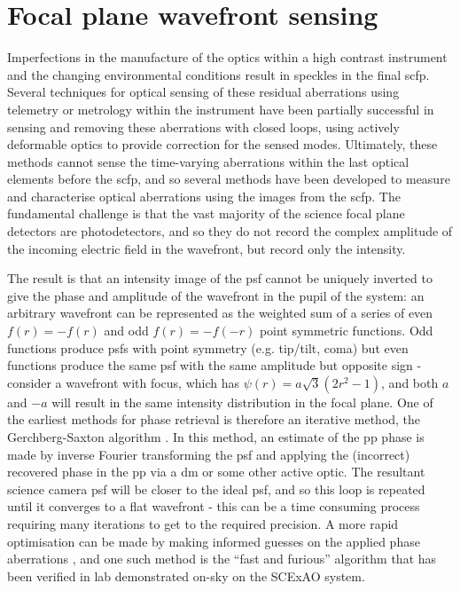 \documentclass[letterpaper]{ar-1col}
\begin{document}
\section{Focal plane wavefront sensing}

Imperfections in the manufacture of the optics within a high contrast instrument and the changing environmental conditions result in speckles in the final \ac{scfp}.
%
Several techniques for optical sensing of these residual aberrations using telemetry or metrology within the instrument have been partially successful in sensing and removing these aberrations with closed loops, using actively deformable optics to provide correction for the sensed modes.
%
Ultimately, these methods cannot sense the time-varying aberrations within the last optical elements before the \ac{scfp}, and so several methods have been developed to measure and characterise optical aberrations using the images from the \ac{scfp}.
%
The fundamental challenge is that the vast majority of the science focal plane detectors are photodetectors, and so they do not record the complex amplitude of the incoming electric field in the wavefront, but record only the intensity.

The result is that an intensity image of the \ac{psf} cannot be uniquely inverted to give the phase and amplitude of the wavefront in the pupil of the system: an arbitrary wavefront can be represented as the weighted sum of a series of even $f(r)=-f(r)$ and odd $f(r)=-f(-r)$ point symmetric functions.
%
Odd functions produce \acp{psf} with point symmetry (e.g. tip/tilt, coma) but even functions produce the same \ac{psf} with the same amplitude but opposite sign - consider a wavefront with focus, which has $\psi(r) = a\sqrt{3}(2r^2-1)$, and both $a$ and $-a$ will result in the same intensity distribution in the focal plane.
%
One of the earliest methods for phase retrieval is therefore an iterative method, the Gerchberg-Saxton algorithm \citep{Gerchberg72}.
%
In this method, an estimate of the \ac{pp} phase is made by inverse Fourier transforming the \ac{psf} and applying the (incorrect) recovered phase in the \ac{pp} via a \ac{dm} or some other active optic.
%
The resultant science camera \ac{psf} will be closer to the ideal \ac{psf}, and so this loop is repeated until it converges to a flat wavefront - this can be a time consuming process requiring many iterations to get to the required precision.
%
A more rapid optimisation can be made by making informed guesses on the applied phase aberrations \citep{Gonsalves02}, and one such method is the ``fast and furious'' algorithm \citep{Keller12} that has been verified in lab \citep{Wilby18} demonstrated on-sky \citep{Bos20} on the SCExAO system. 
\end{document}
